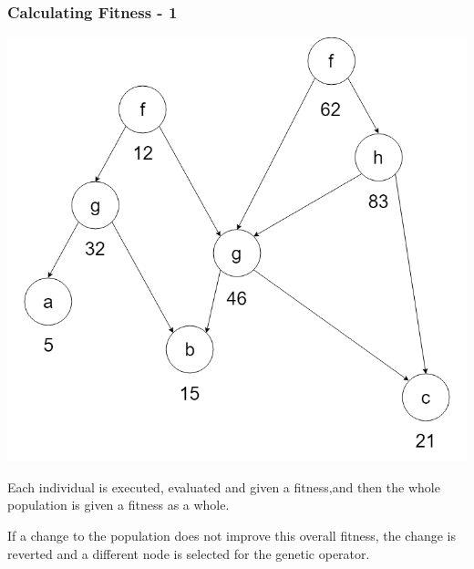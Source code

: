 \documentclass{beamer}
\begin{document}
		\begin{frame}
			\frametitle{Calculating Fitness - 1}
			
			\begin{center}
			
				\includegraphics[scale=0.2]{resources/11_sngp_fitness}
				
				
			\end{center}
			
			Each individual is executed, evaluated and given a fitness,and then the whole population is given a fitness as a whole. 
			
			If a change to the population does not improve this overall fitness, the change is reverted and a different node is selected for the genetic operator.

		\end{frame}
	
\end{document}
